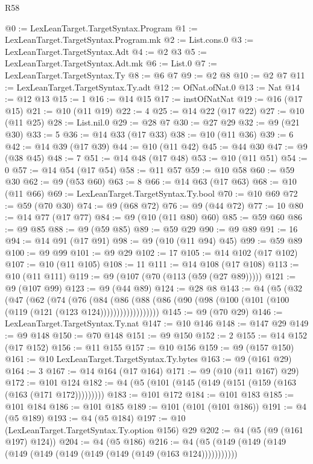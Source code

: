 \begin{lexlean}{R58}
\begin{coremodule}
@0 := LexLeanTarget.TargetSyntax.Program
@1 := LexLeanTarget.TargetSyntax.Program.mk
@2 := List.cons.{0}
@3 := LexLeanTarget.TargetSyntax.Adt
@4 := @2 @3
@5 := LexLeanTarget.TargetSyntax.Adt.mk
@6 := List.{0}
@7 := LexLeanTarget.TargetSyntax.Ty
@8 := @6 @7
@9 := @2 @8
@10 := @2 @7
@11 := LexLeanTarget.TargetSyntax.Ty.adt
@12 := OfNat.ofNat.{0}
@13 := Nat
@14 := @12 @13
@15 := 1
@16 := @14 @15
@17 := instOfNatNat
@19 := @16 (@17 @15)
@21 := @10 (@11 @19)
@22 := 4
@25 := @14 @22 (@17 @22)
@27 := @10 (@11 @25)
@28 := List.nil.{0}
@29 := @28 @7
@30 := @27 @29
@32 := @9 (@21 @30)
@33 := 5
@36 := @14 @33 (@17 @33)
@38 := @10 (@11 @36)
@39 := 6
@42 := @14 @39 (@17 @39)
@44 := @10 (@11 @42)
@45 := @44 @30
@47 := @9 (@38 @45)
@48 := 7
@51 := @14 @48 (@17 @48)
@53 := @10 (@11 @51)
@54 := 0
@57 := @14 @54 (@17 @54)
@58 := @11 @57
@59 := @10 @58
@60 := @59 @30
@62 := @9 (@53 @60)
@63 := 8
@66 := @14 @63 (@17 @63)
@68 := @10 (@11 @66)
@69 := LexLeanTarget.TargetSyntax.Ty.bool
@70 := @10 @69
@72 := @59 (@70 @30)
@74 := @9 (@68 @72)
@76 := @9 (@44 @72)
@77 := 10
@80 := @14 @77 (@17 @77)
@84 := @9 (@10 (@11 @80) @60)
@85 := @59 @60
@86 := @9 @85
@88 := @9 (@59 @85)
@89 := @59 @29
@90 := @9 @89
@91 := 16
@94 := @14 @91 (@17 @91)
@98 := @9 (@10 (@11 @94) @45)
@99 := @59 @89
@100 := @9 @99
@101 := @9 @29
@102 := 17
@105 := @14 @102 (@17 @102)
@107 := @10 (@11 @105)
@108 := 11
@111 := @14 @108 (@17 @108)
@113 := @10 (@11 @111)
@119 := @9 (@107 (@70 (@113 (@59 (@27 @89)))))
@121 := @9 (@107 @99)
@123 := @9 (@44 @89)
@124 := @28 @8
@143 := @4
    (@5
      (@32
        (@47
          (@62
            (@74
              (@76
                (@84
                  (@86
                    (@88 (@86 (@90 (@98 (@100 (@101 (@100 (@119 (@121 (@123 @124))))))))))))))))))
@145 := @9 (@70 @29)
@146 := LexLeanTarget.TargetSyntax.Ty.nat
@147 := @10 @146
@148 := @147 @29
@149 := @9 @148
@150 := @70 @148
@151 := @9 @150
@152 := 2
@155 := @14 @152 (@17 @152)
@156 := @11 @155
@157 := @10 @156
@159 := @9 (@157 @150)
@161 := @10 LexLeanTarget.TargetSyntax.Ty.bytes
@163 := @9 (@161 @29)
@164 := 3
@167 := @14 @164 (@17 @164)
@171 := @9 (@10 (@11 @167) @29)
@172 := @101 @124
@182 := @4 (@5 (@101 (@145 (@149 (@151 (@159 (@163 (@163 (@171 @172)))))))))
@183 := @101 @172
@184 := @101 @183
@185 := @101 @184
@186 := @101 @185
@189 := @101 (@101 (@101 @186))
@191 := @4 (@5 @189)
@193 := @4 (@5 @184)
@197 := @10 (LexLeanTarget.TargetSyntax.Ty.option @156) @29
@202 := @4 (@5 (@9 (@161 @197) @124))
@204 := @4 (@5 @186)
@216 := @4 (@5 (@149 (@149 (@149 (@149 (@149 (@149 (@149 (@149 (@149 (@163 @124)))))))))))

\end{coremodule}
\end{lexlean}
